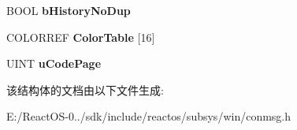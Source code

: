 \begin{DoxyCompactItemize}
B\+O\+OL {\bfseries b\+History\+No\+Dup}
\item 
\mbox{\label{struct___c_o_n_s_o_l_e___p_r_o_p_e_r_t_i_e_s_aacfedaba6f4caceb3f6d14a6ce80abc5}} 
C\+O\+L\+O\+R\+R\+EF {\bfseries Color\+Table} \mbox{[}16\mbox{]}
\item 
\mbox{\label{struct___c_o_n_s_o_l_e___p_r_o_p_e_r_t_i_e_s_a69b08dbcac42c9fefbc858555e3307b8}} 
U\+I\+NT {\bfseries u\+Code\+Page}
\end{DoxyCompactItemize}


该结构体的文档由以下文件生成\+:\begin{DoxyCompactItemize}
\item 
E\+:/\+React\+O\+S-\/0../sdk/include/reactos/subsys/win/conmsg.\+h\end{DoxyCompactItemize}
